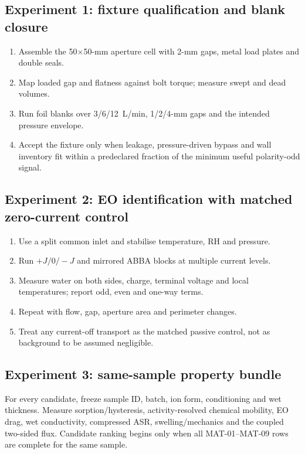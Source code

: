 \documentclass[10pt,a4paper]{article}
\begin{document}
\subsection{Experiment 1: fixture qualification and blank closure}

\begin{enumerate}
  \item Assemble the 50$\times$50-mm aperture cell with 2-mm gaps, metal load
        plates and double seals.
  \item Map loaded gap and flatness against bolt torque; measure swept and dead
        volumes.
  \item Run foil blanks over 3/6/12~L/min, 1/2/4-mm gaps and the intended
        pressure envelope.
  \item Accept the fixture only when leakage, pressure-driven bypass and wall
        inventory fit within a predeclared fraction of the minimum useful
        polarity-odd signal.
\end{enumerate}

\subsection{Experiment 2: EO identification with matched zero-current control}

\begin{enumerate}
  \item Use a split common inlet and stabilise temperature, RH and pressure.
  \item Run $+J/0/-J$ and mirrored ABBA blocks at multiple current levels.
  \item Measure water on both sides, charge, terminal voltage and local
        temperatures; report odd, even and one-way terms.
  \item Repeat with flow, gap, aperture area and perimeter changes.
  \item Treat any current-off transport as the matched passive control, not as
        background to be assumed negligible.
\end{enumerate}

\subsection{Experiment 3: same-sample property bundle}

For every candidate, freeze sample ID, batch, ion form, conditioning and wet
thickness. Measure sorption/hysteresis, activity-resolved chemical mobility,
EO drag, wet conductivity, compressed ASR, swelling/mechanics and the coupled
two-sided flux. Candidate ranking begins only when all MAT-01--MAT-09 rows are
complete for the same sample.
\end{document}
